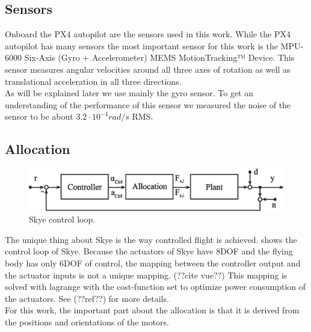 \subsection{Sensors}
Onboard the PX4 autopilot are the sensors used in this work.
While the PX4 autopilot has many sensors the most important sensor for this work is the MPU-6000 Six-Axis (Gyro + Accelerometer) MEMS MotionTracking™ Device.
This sensor measures angular velocities around all three axes of rotation as well as translational acceleration in all three directions. \\
As will be explained later we use mainly the gyro sensor. To get an understanding of the performance of this sensor we measured the noise of the sensor to be about $3.2 \cdot 10^{-4}rad/s$ RMS.

\subsection{Allocation}

\begin{figure}[hbtp]
\centering
\includegraphics[width=.9\linewidth]{images/system_loop_3.eps}
\caption{Skye control loop.}
\label{fig:system_loop_3}
\end{figure}

The unique thing about Skye is the way controlled flight is achieved. 
 shows the control loop of Skye.
Because the actuators of Skye have 8DOF and the flying body has only 6DOF of control, the mapping between the controller output and the actuator inputs is not a unique mapping. (??cite vue??)
This mapping is solved with lagrange with the cost-function set to optimize power consumption of the actuators. See (??ref??) for more details.\\
For this work, the important part about the allocation is that it is derived from the positions and orientations of the motors.

